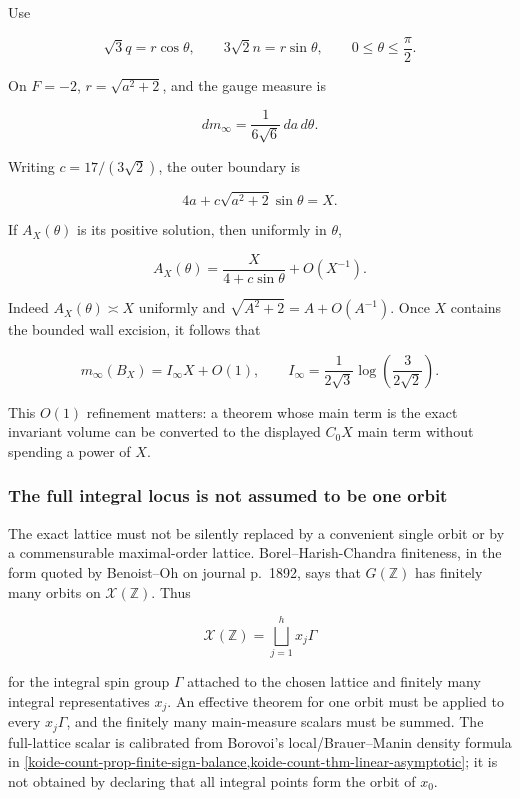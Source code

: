 Use

\[
 \sqrt3q=r\cos\theta,
 \qquad 3\sqrt2n=r\sin\theta,
 \qquad 0\leq\theta\leq\frac\pi2.
\]

On \(F=-2\), \(r=\sqrt{a^2+2}\), and the gauge measure is

\[
 dm_\infty=\frac1{6\sqrt6}\,da\,d\theta.
\]

Writing \(c=17/(3\sqrt2)\), the outer boundary is

\[
 4a+c\sqrt{a^2+2}\sin\theta=X.
\]

If \(A_X(\theta)\) is its positive solution, then uniformly in \(\theta\),

\[
 A_X(\theta)=\frac{X}{4+c\sin\theta}+O(X^{-1}).
\]

Indeed \(A_X(\theta)\asymp X\) uniformly and \(\sqrt{A^2+2}=A+O(A^{-1})\). Once \(X\) contains the bounded wall excision, it follows that

\[
 m_\infty(B_X)=I_\infty X+O(1),
 \qquad
 I_\infty=\frac1{2\sqrt3}\log\!\left(\frac3{2\sqrt2}\right).
\]

This \(O(1)\) refinement matters: a theorem whose main term is the exact invariant volume can be converted to the displayed \(C_0X\) main term without spending a power of \(X\).

\subsubsection{The full integral locus is not assumed to be one orbit}\label{koide-lit-the-full-integral-locus-is-not-assumed-to-be-one-orbit}

The exact lattice must not be silently replaced by a convenient single orbit or by a commensurable maximal-order lattice. Borel--Harish-Chandra finiteness, in the form quoted by Benoist--Oh on journal p.~1892, says that \(G(\mathbb Z)\) has finitely many orbits on \(\mathscr X(\mathbb Z)\). Thus

\[
 \mathscr X(\mathbb Z)=\bigsqcup_{j=1}^{h}x_j\Gamma
\]

for the integral spin group \(\Gamma\) attached to the chosen lattice and finitely many integral representatives \(x_j\). An effective theorem for one orbit must be applied to every \(x_j\Gamma\), and the finitely many main-measure scalars must be summed. The full-lattice scalar is calibrated from Borovoi's local/Brauer--Manin density formula in \cref{koide-count-prop-finite-sign-balance,koide-count-thm-linear-asymptotic}; it is not obtained by declaring that all integral points form the orbit of \(x_0\).

